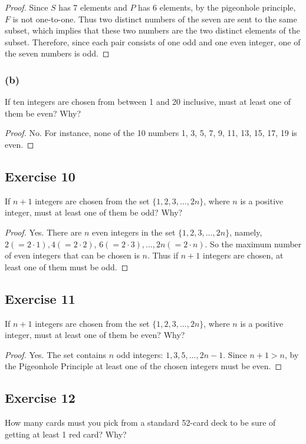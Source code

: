 \documentclass[14pt]{extarticle}
\begin{document}
\begin{proof}
Since \(S\) has 7 elements and \(P\) has 6 elements, by the pigeonhole principle, \(F\) is not one-to-one. Thus two 
distinct numbers of the seven are sent to the same subset, which implies that these two numbers are the two distinct 
elements of the subset. Therefore, since each pair consists of one odd and one even integer, one of the seven numbers 
is odd.
\end{proof}

\subsubsection{(b)}
If ten integers are chosen from between 1 and 20 inclusive, must at least one of them be even? Why?

\begin{proof}
No. For instance, none of the 10 numbers 1, 3, 5, 7,
9, 11, 13, 15, 17, 19 is even.
\end{proof}

\subsection{Exercise 10}
If \(n + 1\) integers are chosen from the set \(\{1, 2, 3, \ldots, 2n\}\), where \(n\) is a positive integer, must at 
least one of them be odd? Why?

\begin{proof}
Yes. There are \(n\) even integers in the set \(\{1, 2, 3, \ldots, 2n\}\), namely, \(2(= 2 \cdot 1), 4(= 2 \cdot 2)\), \(6(= 2 \cdot 3), \ldots, 2n(= 2 \cdot n)\). So the maximum number of even integers that can be chosen is \(n\). Thus 
if \(n + 1\) integers are chosen, at least one of them must be odd.
\end{proof}

\subsection{Exercise 11}
If \(n + 1\) integers are chosen from the set \(\{1, 2, 3, \ldots, 2n\}\), where \(n\) is a positive integer, must at 
least one of them be even? Why?

\begin{proof}
Yes. The set contains \(n\) odd integers: \(1, 3, 5, \ldots, 2n-1\). Since \(n+1 > n\), by the Pigeonhole Principle at least one of the chosen integers must be even.
\end{proof}

\subsection{Exercise 12}
How many cards must you pick from a standard 52-card deck to be sure of getting at least 1 red card? Why?
\end{document}
